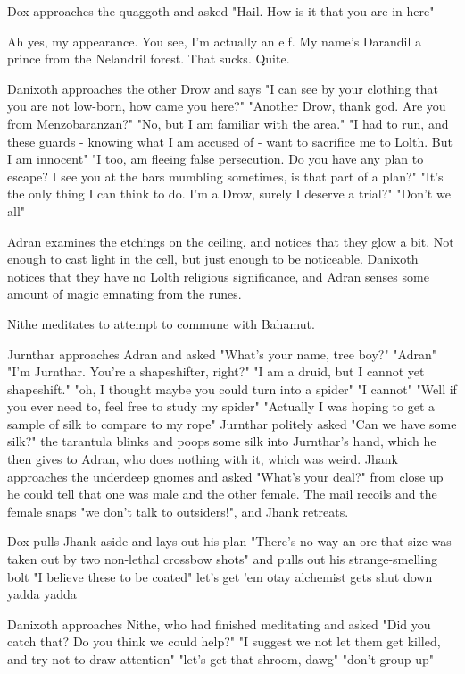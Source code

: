 \documentclass[letterpaper,10pt,twoside,twocolumn,openany]{book}
\begin{document}
Dox approaches the quaggoth and asked "Hail. How is it that you are in here"

Ah yes, my appearance. You see, I'm actually an elf. My name's Darandil a prince from the Nelandril forest.
That sucks.
Quite.

Danixoth approaches the other Drow and says "I can see by your clothing that you are not low-born, how came you here?"
"Another Drow, thank god. Are you from Menzobaranzan?"
"No, but I am familiar with the area."
"I had to run, and these guards - knowing what I am accused of - want to sacrifice me to Lolth. But I am innocent"
"I too, am fleeing false persecution. Do you have any plan to escape? I see you at the bars mumbling sometimes, is that part of a plan?"
"It's the only thing I can think to do. I'm a Drow, surely I deserve a trial?"
"Don't we all"

Adran examines the etchings on the ceiling, and notices that they glow a bit. Not enough to cast light in the cell, but just enough to be noticeable. Danixoth notices that they have no Lolth religious significance, and Adran senses some amount of magic emnating from the runes. 

Nithe meditates to attempt to commune with Bahamut.

Jurnthar approaches Adran and asked "What's your name, tree boy?" "Adran" "I'm Jurnthar. You're a shapeshifter, right?" "I am a druid, but I cannot yet shapeshift." "oh, I thought maybe you could turn into a spider" "I cannot" "Well if you ever need to, feel free to study my spider" "Actually I was hoping to get a sample of silk to compare to my rope" Jurnthar politely asked "Can we have some silk?" the tarantula blinks and poops some silk into Jurnthar's hand, which he then gives to Adran, who does nothing with it, which was weird. Jhank approaches the underdeep gnomes and asked "What's your deal?" from close up he could tell that one was male and the other female. The mail recoils and the female snaps "we don't talk to outsiders!", and Jhank retreats.

Dox pulls Jhank aside and lays out his plan "There's no way an orc that size was taken out by two non-lethal crossbow shots" and pulls out his strange-smelling bolt "I believe these to be coated" let's get 'em otay alchemist gets shut down yadda yadda

Danixoth approaches Nithe, who had finished meditating and asked "Did you catch that? Do you think we could help?" "I suggest we not let them get killed, and try not to draw attention" "let's get that shroom, dawg" "don't group up"
\end{document}
